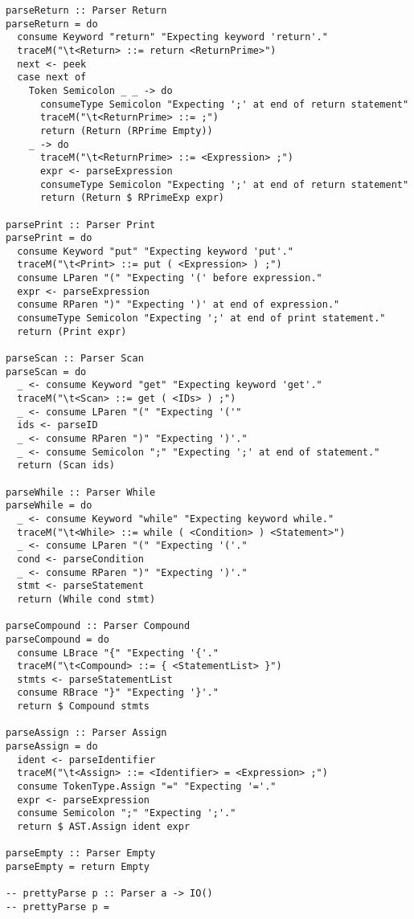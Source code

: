 \documentclass[11pt]{article}
\begin{document}
\begin{verbatim}
parseReturn :: Parser Return
parseReturn = do
  consume Keyword "return" "Expecting keyword 'return'."
  traceM("\t<Return> ::= return <ReturnPrime>")
  next <- peek
  case next of
    Token Semicolon _ _ -> do
      consumeType Semicolon "Expecting ';' at end of return statement"
      traceM("\t<ReturnPrime> ::= ;")
      return (Return (RPrime Empty))
    _ -> do
      traceM("\t<ReturnPrime> ::= <Expression> ;")
      expr <- parseExpression
      consumeType Semicolon "Expecting ';' at end of return statement"
      return (Return $ RPrimeExp expr)

parsePrint :: Parser Print
parsePrint = do
  consume Keyword "put" "Expecting keyword 'put'."
  traceM("\t<Print> ::= put ( <Expression> ) ;")
  consume LParen "(" "Expecting '(' before expression."
  expr <- parseExpression
  consume RParen ")" "Expecting ')' at end of expression."
  consumeType Semicolon "Expecting ';' at end of print statement."
  return (Print expr)

parseScan :: Parser Scan
parseScan = do
  _ <- consume Keyword "get" "Expecting keyword 'get'."
  traceM("\t<Scan> ::= get ( <IDs> ) ;")
  _ <- consume LParen "(" "Expecting '('"
  ids <- parseID
  _ <- consume RParen ")" "Expecting ')'."
  _ <- consume Semicolon ";" "Expecting ';' at end of statement."
  return (Scan ids)

parseWhile :: Parser While
parseWhile = do
  _ <- consume Keyword "while" "Expecting keyword while."
  traceM("\t<While> ::= while ( <Condition> ) <Statement>")
  _ <- consume LParen "(" "Expecting '('."
  cond <- parseCondition
  _ <- consume RParen ")" "Expecting ')'."
  stmt <- parseStatement
  return (While cond stmt)

parseCompound :: Parser Compound
parseCompound = do
  consume LBrace "{" "Expecting '{'."
  traceM("\t<Compound> ::= { <StatementList> }")
  stmts <- parseStatementList
  consume RBrace "}" "Expecting '}'."
  return $ Compound stmts

parseAssign :: Parser Assign
parseAssign = do
  ident <- parseIdentifier
  traceM("\t<Assign> ::= <Identifier> = <Expression> ;")
  consume TokenType.Assign "=" "Expecting '='."
  expr <- parseExpression
  consume Semicolon ";" "Expecting ';'."
  return $ AST.Assign ident expr

parseEmpty :: Parser Empty
parseEmpty = return Empty

-- prettyParse p :: Parser a -> IO()
-- prettyParse p =
\end{verbatim}
\end{document}
